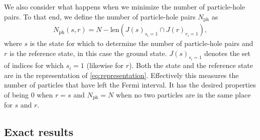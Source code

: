 \documentclass[11pt, a4paper]{report} %
\begin{document}
We also consider what happens when we minimize the number of particle-hole pairs.
To that end, we define the number of particle-hole pairs \(N_{\mathrm{ph}}\) as
\begin{align}
  \label{eq:52}
  N_{\mathrm{ph}}(s, r) = N - \mathrm{len}(J{(s)}_{s_i=1}\cap J{(r)}_{r_i=1}), 
\end{align}
where \(s\) is the state for which to determine the number of particle-hole pairs and \(r\) is the reference state, in this case the ground state.
\(J{(s)}_{s_i=1}\) denotes the set of indices for which \(s_i = 1\) (likewise for \(r\)).
Both the state and the reference state are in the representation of \cref{eq:representation}.
Effectively this measures the number of particles that have left the Fermi interval.
It has the desired properties of being 0 when \(r=s\) and \(N_{\mathrm{ph}} = N\) when no two particles are in the same place for \(s\) and \(r\).


\subsection{Exact results}\label{sec:exact}
\end{document}
